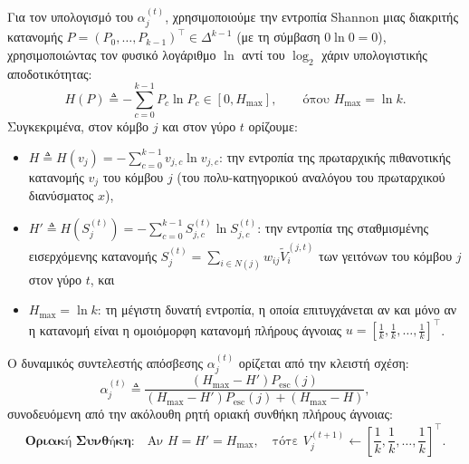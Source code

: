 \documentclass[11pt, a4paper]{article}
\theoremstyle{definition}
\theoremstyle{definition}
\begin{document}
Για τον υπολογισμό του $\alpha_j^{(t)}$, χρησιμοποιούμε την εντροπία Shannon μιας διακριτής κατανομής $P = (P_0, \dots, P_{k-1})^\top \in \Delta^{k-1}$ (με τη σύμβαση $0 \ln 0 = 0$), χρησιμοποιώντας τον φυσικό λογάριθμο $\ln$ αντί του $\log_2$ χάριν υπολογιστικής αποδοτικότητας:
\begin{equation}\label{eq:shannon_gr}
H(P) \triangleq -\sum_{c=0}^{k-1} P_c \ln P_c \in [0, H_{\max}], \qquad \text{όπου } H_{\max} = \ln k.
\end{equation}
Συγκεκριμένα, στον κόμβο $j$ και στον γύρο $t$ ορίζουμε:
\begin{itemize}
\item $H \triangleq H(v_j) = -\sum_{c=0}^{k-1} v_{j,c} \ln v_{j,c}$: την εντροπία της πρωταρχικής πιθανοτικής κατανομής $v_j$ του κόμβου $j$ (του πολυ-κατηγορικού αναλόγου του πρωταρχικού διανύσματος $x$),
\item $H' \triangleq H\!\left(S_j^{(t)}\right) = -\sum_{c=0}^{k-1} S_{j,c}^{(t)} \ln S_{j,c}^{(t)}$: την εντροπία της σταθμισμένης εισερχόμενης κατανομής $S_j^{(t)} = \sum_{i \in N(j)} w_{ij}\tilde{V}_i^{(j,t)}$ των γειτόνων του κόμβου $j$ στον γύρο $t$, και
\item $H_{\max} = \ln k$: τη μέγιστη δυνατή εντροπία, η οποία επιτυγχάνεται αν και μόνο αν η κατανομή είναι η ομοιόμορφη κατανομή πλήρους άγνοιας $u = \left[\frac{1}{k}, \frac{1}{k}, \dots, \frac{1}{k}\right]^\top$.
\end{itemize}

Ο δυναμικός συντελεστής απόσβεσης $\alpha_j^{(t)}$ ορίζεται από την κλειστή σχέση:
\begin{equation}\label{eq:alpha_formula_gr}
\boxed{\;\alpha_j^{(t)} \triangleq \frac{\left(H_{\max} - H'\right) P_{\mathrm{esc}}(j)}{\left(H_{\max} - H'\right) P_{\mathrm{esc}}(j) + \left(H_{\max} - H\right)},\;}
\end{equation}
συνοδευόμενη από την ακόλουθη ρητή οριακή συνθήκη πλήρους άγνοιας:
\begin{equation}\label{eq:boundary_rule_gr}
\textbf{Οριακή Συνθήκη:} \quad \text{Αν } H = H' = H_{\max}, \quad \text{τότε } V_j^{(t+1)} \leftarrow \left[\frac{1}{k}, \frac{1}{k}, \dots, \frac{1}{k}\right]^\top.
\end{equation}
\end{document}

